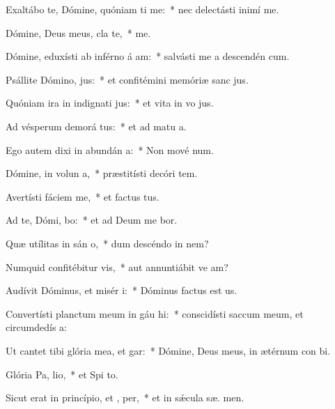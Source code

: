 \item Exaltábo te, Dómine, quóniam ti me:~* nec delectásti inimí   me.
\item Dómine, Deus meus, cla  te,~*   me.
\item Dómine, eduxísti ab inférno á am:~* salvásti me a descendén  cum.
\item Psállite Dómino,  jus:~* et confitémini memóriæ sanc jus.
\item Quóniam ira in indignati jus:~* et vita in vo jus.
\item Ad vésperum demorá tus:~* et ad matu a.
\item Ego autem dixi in abundán a:~* Non mové  num.
\item Dómine, in volun a,~* præstitísti decóri  tem.
\item Avertísti fáciem   me,~* et factus  tus.
\item Ad te, Dómi, bo:~* et ad Deum me bor.
\item Quæ utílitas in sán o,~* dum descéndo in nem?
\item Numquid confitébitur  vis,~* aut annuntiábit ve am?
\item Audívit Dóminus, et misér  i:~* Dóminus factus est  us.
\item Convertísti planctum meum in gáu hi:~* conscidísti saccum meum, et circumdedís  a:
\item Ut cantet tibi glória mea, et  gar:~* Dómine, Deus meus, in ætérnum con bi.
\item Glória Pa,  lio,~* et Spi to.
\item Sicut erat in princípio, et ,  per,~* et in sǽcula sæ. men.
